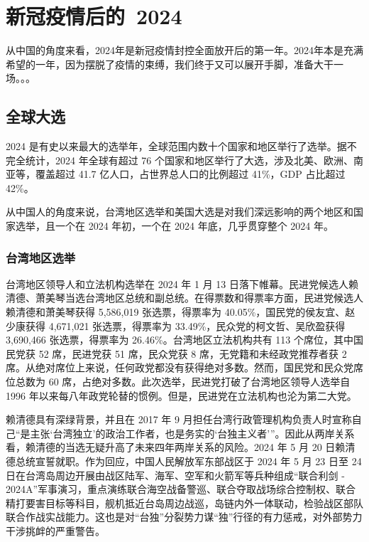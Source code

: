 \chapter{新冠疫情后的~2024}

从中国的角度来看，2024年是新冠疫情封控全面放开后的第一年。2024年本是充满希望的一年，因为摆脱了疫情的束缚，我们终于又可以展开手脚，准备大干一场。。。

\section{全球大选}

2024 是有史以来最大的选举年，全球范围内数十个国家和地区举行了选举。据不完全统计，2024 年全球有超过 76 个国家和地区举行了大选，涉及北美、欧洲、南亚等，覆盖超过 41.7 亿人口，占世界总人口的比例超过 41\%，GDP 占比超过 42\%。 

从中国人的角度来说，台湾地区选举和美国大选是对我们深远影响的两个地区和国家选举，且一个在 2024 年初，一个在 2024 年底，几乎贯穿整个 2024 年。

\subsection{台湾地区选举}

台湾地区领导人和立法机构选举在 2024 年 1 月 13 日落下帷幕。民进党候选人赖清德、萧美琴当选台湾地区总统和副总统。在得票数和得票率方面，民进党候选人赖清德和萧美琴获得 5,586,019 张选票，得票率为 40.05\%，国民党的侯友宜、赵少康获得 4,671,021 张选票，得票率为 33.49\%，民众党的柯文哲、吴欣盈获得 3,690,466 张选票，得票率为 26.46\%。台湾地区立法机构共有 113 个席位，其中国民党获 52 席，民进党获 51 席，民众党获 8 席，无党籍和未经政党推荐者获 2 席。从绝对席位上来说，任何政党都没有获得绝对多数。然而，国民党和民众党席位总数为 60 席，占绝对多数。此次选举，民进党打破了台湾地区领导人选举自 1996 年以来每八年政党轮替的惯例。但是，民进党在立法机构也沦为第二大党。

赖清德具有深绿背景，并且在 2017 年 9 月担任台湾行政管理机构负责人时宣称自己“是主张‘台湾独立’的政治工作者，也是务实的‘台独主义者’”。因此从两岸关系看，赖清德的当选无疑升高了未来四年两岸关系的风险。2024 年 5 月 20 日赖清德总统宣誓就职。作为回应，中国人民解放军东部战区于 2024 年 5 月 23 日至 24 日在台湾岛周边开展由战区陆军、海军、空军和火箭军等兵种组成“联合利剑 - 2024A”军事演习，重点演练联合海空战备警巡、联合夺取战场综合控制权、联合精打要害目标等科目，舰机抵近台岛周边战巡，岛链内外一体联动，检验战区部队联合作战实战能力。这也是对“台独”分裂势力谋“独”行径的有力惩戒，对外部势力干涉挑衅的严重警告。

